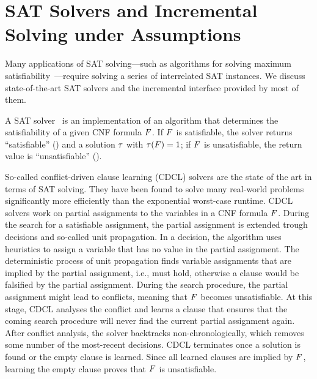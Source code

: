 \section{SAT Solvers and Incremental Solving under Assumptions\label{sec:inc-sat}}

Many applications of SAT solving---such as algorithms for solving maximum satisfiability~\autocite{handbook2-maxsat}---require solving a series of interrelated SAT instances.
We discuss state-of-the-art SAT solvers and the incremental interface provided by most of them.

A SAT solver~\autocite{handbook2-cdcl} is an implementation of an algorithm that determines the satisfiability of a given CNF formula $F$.
If $F$ is satisfiable, the solver returns ``satisfiable'' (\sat{}) and a solution $\tau$ with $\tau(F)=1$;
if $F$ is unsatisfiable, the return value is ``unsatisfiable'' (\unsat{}).

So-called conflict-driven clause learning (CDCL) solvers are the state of the art in terms of SAT solving.
They have been found to solve many real-world problems significantly more efficiently than the exponential worst-case runtime.
CDCL solvers work on partial assignments to the variables in a CNF formula $F$.
During the search for a satisfiable assignment, the partial assignment is extended trough decisions and so-called unit propagation.
In a decision, the algorithm uses heuristics to assign a variable that has no value in the partial assignment.
The deterministic process of unit propagation finds variable assignments that are implied by the partial assignment, i.e., must hold, otherwise a clause would be falsified by the partial assignment.
During the search procedure, the partial assignment might lead to conflicts, meaning that $F$ becomes unsatisfiable.
At this stage, CDCL analyses the conflict and learns a clause that ensures that the coming search procedure will never find the current partial assignment again.
After conflict analysis, the solver backtracks non-chronologically, which removes some number of the most-recent decisions.
CDCL terminates once a solution is found or the empty clause is learned.
Since all learned clauses are implied by $F$, learning the empty clause proves that $F$ is unsatisfiable.

